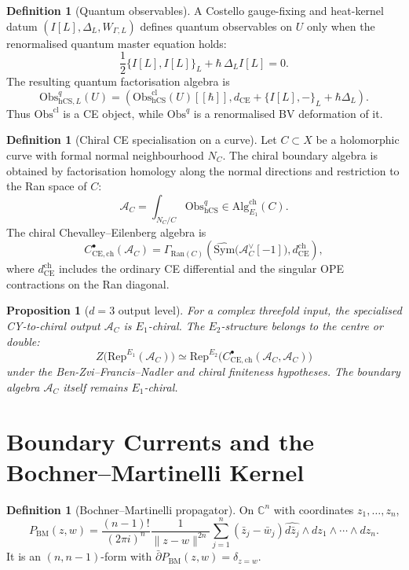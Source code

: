 \documentclass[11pt]{article}
\newtheorem{proposition}[theorem]{Proposition}
\theoremstyle{definition}
\newtheorem{definition}[theorem]{Definition}
\theoremstyle{remark}
\newcommand{\CC}{\mathbb{C}}
\newcommand{\hCS}{\mathrm{hCS}}
\newcommand{\Obs}{\mathrm{Obs}}
\newcommand{\CE}{\mathrm{CE}}
\newcommand{\Sym}{\mathrm{Sym}}
\newcommand{\Rep}{\mathrm{Rep}}
\newcommand{\PBM}{P_{\mathrm{BM}}}
\newcommand{\Eone}{E_1}
\newcommand{\Etwo}{E_2}
\begin{document}
\begin{definition}[Quantum observables]
\label{def:quantum-hcs-observables}
A Costello gauge-fixing and heat-kernel datum
\((I[L],\Delta_L,W_{\Gamma,L})\) defines quantum observables on \(U\)
only when the renormalised quantum master equation holds:
\[
  \frac12\{I[L],I[L]\}_{L}+\hbar\,\Delta_L I[L]=0 .
\]
The resulting quantum factorisation algebra is
\[
  \Obs^{q}_{\hCS,L}(U)
  =
  \left(
  \Obs^{\mathrm{cl}}_{\hCS}(U)[[\hbar]],
  d_{\CE}+\{I[L],-\}_{L}+\hbar\Delta_L
  \right).
\]
Thus \(\Obs^{\mathrm{cl}}\) is a CE object, while \(\Obs^q\) is a
renormalised BV deformation of it.
\end{definition}

\begin{definition}[Chiral CE specialisation on a curve]
\label{def:chiral-ce-specialisation}
Let \(C\subset X\) be a holomorphic curve with formal normal
neighbourhood \(N_C\). The chiral boundary algebra is obtained by
factorisation homology along the normal directions and restriction to
the Ran space of \(C\):
\[
  \mathcal A_C
  =
  \int_{N_C/C}\Obs^q_{\hCS}
  \in
  \mathrm{Alg}_{\Eone}^{\mathrm{ch}}(C).
\]
The chiral Chevalley--Eilenberg algebra is
\[
  C^\bullet_{\CE,\mathrm{ch}}(\mathcal A_C)
  =
  \Gamma_{\mathrm{Ran}(C)}
  \left(
  \widehat{\Sym}\bigl(\mathcal A_C^\vee[-1]\bigr),
  d_{\CE}^{\mathrm{ch}}
  \right),
\]
where \(d_{\CE}^{\mathrm{ch}}\) includes the ordinary CE differential
and the singular OPE contractions on the Ran diagonal.
\end{definition}

\begin{proposition}[\(d=3\) output level]
\label{prop:d3-output-e1}
For a complex threefold input, the specialised CY-to-chiral output
\(\mathcal A_C\) is \(\Eone\)-chiral. The \(\Etwo\)-structure belongs to
the centre or double:
\[
  Z\bigl(\Rep^{\Eone}(\mathcal A_C)\bigr)
  \simeq
  \Rep^{\Etwo}\bigl(C^\bullet_{\CE,\mathrm{ch}}(\mathcal A_C,\mathcal A_C)\bigr)
\]
under the Ben-Zvi--Francis--Nadler and chiral finiteness hypotheses.
The boundary algebra \(\mathcal A_C\) itself remains \(\Eone\)-chiral.
\end{proposition}

\section{Boundary Currents and the Bochner--Martinelli Kernel}
\label{sec:bm-boundary}

\begin{definition}[Bochner--Martinelli propagator]
\label{def:bm-kernel}
On \(\CC^n\) with coordinates \(z_1,\ldots,z_n\),
\[
  \PBM(z,w)
  =
  \frac{(n-1)!}{(2\pi i)^n}
  \frac{1}{\|z-w\|^{2n}}
  \sum_{j=1}^{n}(\bar z_j-\bar w_j)
  \widehat{d\bar z_j}\wedge dz_1\wedge\cdots\wedge dz_n .
\]
It is an \((n,n-1)\)-form with
\(\bar\partial\PBM(z,w)=\delta_{z=w}\).
\end{definition}
\end{document}
